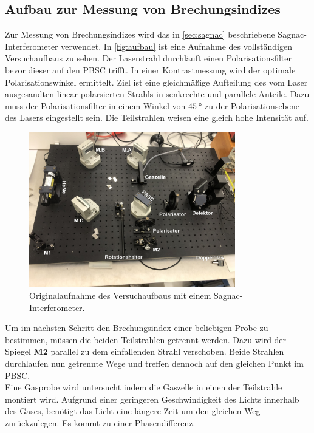 \subsection{Aufbau zur Messung von Brechungsindizes}
Zur Messung von Brechungsindizes wird das in \autoref{sec:sagnac} beschriebene Sagnac-Interferometer verwendet.
In \autoref{fig:aufbau} ist eine Aufnahme des vollständigen Versuchaufbaus zu sehen.
Der Laserstrahl durchläuft einen Polarisationsfilter bevor dieser auf den PBSC trifft.
In einer Kontrastmessung wird der optimale Polarisationswinkel ermittelt.
Ziel ist eine gleichmäßige Aufteilung des vom Laser ausgesandten linear polarsierten Strahls in senkrechte und parallele Anteile.
Dazu muss der Polarisationsfilter in einem Winkel von $\qty{45}{\degree}$ zu der Polarisationsebene des Lasers eingestellt sein.
Die Teilstrahlen weisen eine gleich hohe Intensität auf.
\begin{figure}
    \centering
    \includegraphics[width=0.8\textwidth]{img/aufbau2.jpg}
    \caption{Originalaufnahme des Versuchaufbaus mit einem Sagnac-Interferometer.}
    \label{fig:aufbau_original}
\end{figure}
Um im nächsten Schritt den Brechungsindex einer beliebigen Probe zu bestimmen, müssen die beiden Teilstrahlen getrennt werden.
Dazu wird der Spiegel $\textbf{M2}$ parallel zu dem einfallenden Strahl verschoben.
Beide Strahlen durchlaufen nun getrennte Wege und treffen dennoch auf den gleichen Punkt im PBSC.
\\
Eine Gasprobe wird untersucht indem die Gaszelle in einen der Teilstrahle montiert wird.
Aufgrund einer geringeren Geschwindigkeit des Lichts innerhalb des Gases, benötigt das Licht eine längere Zeit um den gleichen Weg zurückzulegen.
Es kommt zu einer Phasendifferenz.
\\
